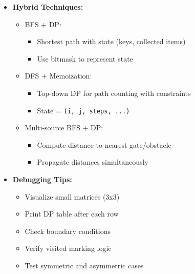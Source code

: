 \documentclass[a4paper,10pt]{book}
\begin{document}
\begin{itemize}
    \item \textbf{Hybrid Techniques:}
    \begin{itemize}
        \item BFS + DP: 
        \begin{itemize}
            \item Shortest path with state (keys, collected items)
            \item Use bitmask to represent state
        \end{itemize}
        \item DFS + Memoization: 
        \begin{itemize}
            \item Top-down DP for path counting with constraints
            \item State = \texttt{(i, j, steps, ...)}
        \end{itemize}
        \item Multi-source BFS + DP: 
        \begin{itemize}
            \item Compute distance to nearest gate/obstacle
            \item Propagate distances simultaneously
        \end{itemize}
    \end{itemize}
    
    \item \textbf{Debugging Tips:}
    \begin{itemize}
        \item Visualize small matrices (3x3)
        \item Print DP table after each row
        \item Check boundary conditions
        \item Verify visited marking logic
        \item Test symmetric and asymmetric cases
    \end{itemize}
\end{itemize}
\end{document}
